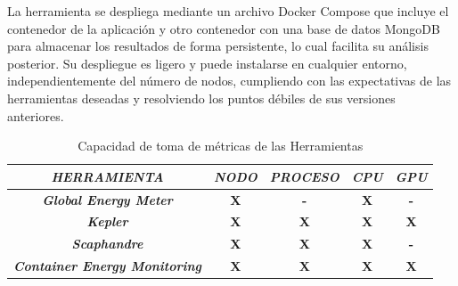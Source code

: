   La herramienta se despliega mediante un archivo Docker Compose que incluye el contenedor de la aplicación y otro contenedor con una base de datos MongoDB para almacenar los resultados de forma persistente, lo cual facilita su análisis posterior. Su despliegue es ligero y puede instalarse en cualquier entorno, independientemente del número de nodos, cumpliendo con las expectativas de las herramientas deseadas y resolviendo los puntos débiles de sus versiones anteriores.\

 \begin{table}[h!]
      \centering
      \begin{tabular}{|c|c|c|c|c|}
      \hline
      \rowcolor[HTML]{C0C0C0} 
      \textit{\textbf{HERRAMIENTA}}                          & \textit{\textbf{NODO}} & \multicolumn{1}{l|}{\cellcolor[HTML]{C0C0C0}\textit{\textbf{PROCESO}}} & \multicolumn{1}{l|}{\cellcolor[HTML]{C0C0C0}\textit{\textbf{CPU}}} & \multicolumn{1}{l|}{\cellcolor[HTML]{C0C0C0}\textit{\textbf{GPU}}} \\ \hline
      \cellcolor[HTML]{EFEFEF}\textit{\textbf{Global Energy Meter}} & \textbf{X}             & \textbf{-}                                                             & \textbf{X}                                                         & \textbf{-}                                                         \\ \hline
      \cellcolor[HTML]{EFEFEF}\textit{\textbf{Kepler}}       & \textbf{X}             & \textbf{X}                                                             & \textbf{X}                                                         & \textbf{X}                                                         \\ \hline
      \cellcolor[HTML]{EFEFEF}\textit{\textbf{Scaphandre}}   & \textbf{X}             & \textbf{X}                                                             & \textbf{X}                                                         & \textbf{-}                                                         \\ \hline
      \cellcolor[HTML]{EFEFEF}\textit{\textbf{Container Energy Monitoring}}      & \textbf{X}             & \textbf{X}                                                             & \textbf{X}                                                         & \textbf{X}                                                         \\ \hline
      \end{tabular}
      \caption{Capacidad de toma de métricas de las Herramientas}
      \label{tab:especi-herramientas-capacidad-metricas}
 \end{table}
